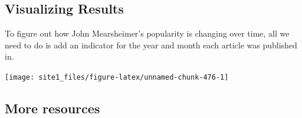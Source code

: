 \documentclass[]{book}
\newenvironment{Shaded}{\begin{snugshade}}{\end{snugshade}}
\newcommand{\CommentTok}[1]{\textcolor[rgb]{0.56,0.35,0.01}{\textit{#1}}}
\newcommand{\DataTypeTok}[1]{\textcolor[rgb]{0.13,0.29,0.53}{#1}}
\newcommand{\DecValTok}[1]{\textcolor[rgb]{0.00,0.00,0.81}{#1}}
\newcommand{\KeywordTok}[1]{\textcolor[rgb]{0.13,0.29,0.53}{\textbf{#1}}}
\newcommand{\NormalTok}[1]{#1}
\newcommand{\OperatorTok}[1]{\textcolor[rgb]{0.81,0.36,0.00}{\textbf{#1}}}
\newcommand{\StringTok}[1]{\textcolor[rgb]{0.31,0.60,0.02}{#1}}
\begin{document}
\hypertarget{visualizing-results}{%
\subsection{Visualizing Results}\label{visualizing-results}}

To figure out how John Mearsheimer's popularity is changing over time, all we need to do is add an indicator for the year and month each article was published in.

\begin{Shaded}
\end{Shaded}

\begin{center}\texttt{[image: site1\_files/figure-latex/unnamed-chunk-476-1]} \end{center}

\hypertarget{more-resources-1}{%
\subsection{More resources}\label{more-resources-1}}
\end{document}
